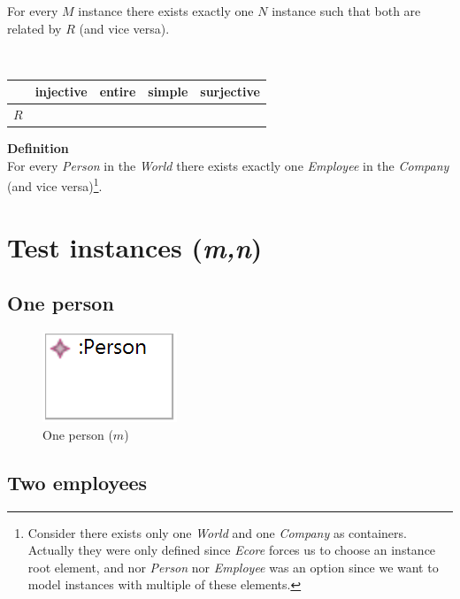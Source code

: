 \documentclass{article}
\newcommand{\cmark}{\ding{51}}%
\begin{document}
For every $M$ instance there
exists exactly one $N$ instance such that both are related by $R$ (and vice versa).

~\\

\begin{center}
\begin{tabular}{| c | c | c | c | c | }
  \hline                        
   & injective & entire & simple & surjective \\
  \hline 
  $R$ & \cmark & \cmark & \cmark & \cmark\\
  \hline  
\end{tabular}
\end{center}


\textbf{Definition}\\

For every \textit{Person} in the \textit{World} there
exists exactly one \textit{Employee} in the \textit{Company} (and vice versa)\footnote{Consider there exists only one \textit{World} and one \textit{Company} as containers. Actually they were only defined since \textit{Ecore} forces us to choose an instance root element, and nor \textit{Person} nor \textit{Employee} was an option since we want to model instances with multiple of these elements.}.


\pagebreak
\section{Test instances (\textit{m,n})}

\subsection{One person}
\label{sec:one-person}

\begin{figure}[ht]
    \centering
    \includegraphics[scale=0.35]{graphics/bij-one-person.png}
    \caption{One person ($m$)}
    \label{fig:I1}
\end{figure}

\subsection{Two employees}
\label{sec:two-employees}
\end{document}
